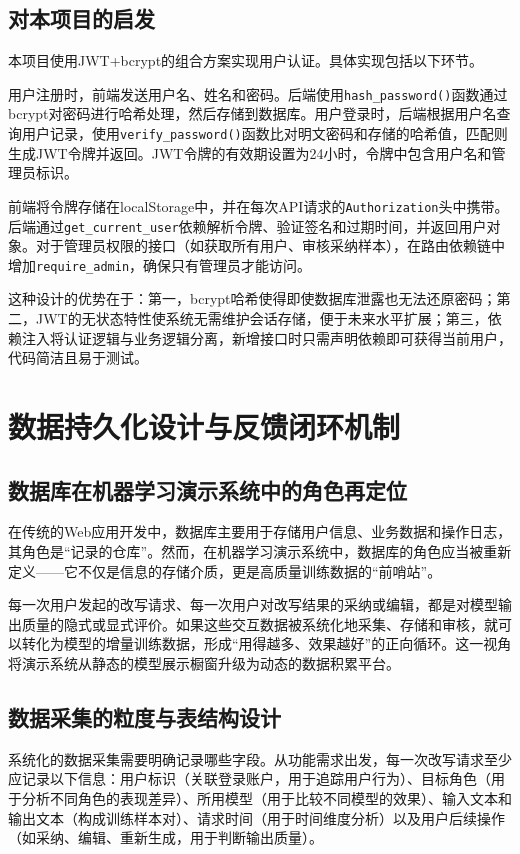 \documentclass[12pt,a4paper]{ctexart}
\begin{document}
\subsection{对本项目的启发}

本项目使用JWT+bcrypt的组合方案实现用户认证。具体实现包括以下环节。

用户注册时，前端发送用户名、姓名和密码。后端使用\texttt{hash\_password()}函数通过bcrypt对密码进行哈希处理，然后存储到数据库。用户登录时，后端根据用户名查询用户记录，使用\texttt{verify\_password()}函数比对明文密码和存储的哈希值，匹配则生成JWT令牌并返回。JWT令牌的有效期设置为24小时，令牌中包含用户名和管理员标识。

前端将令牌存储在localStorage中，并在每次API请求的\texttt{Authorization}头中携带。后端通过\texttt{get\_current\_user}依赖解析令牌、验证签名和过期时间，并返回用户对象。对于管理员权限的接口（如获取所有用户、审核采纳样本），在路由依赖链中增加\texttt{require\_admin}，确保只有管理员才能访问。

这种设计的优势在于：第一，bcrypt哈希使得即使数据库泄露也无法还原密码；第二，JWT的无状态特性使系统无需维护会话存储，便于未来水平扩展；第三，依赖注入将认证逻辑与业务逻辑分离，新增接口时只需声明依赖即可获得当前用户，代码简洁且易于测试。

\section{数据持久化设计与反馈闭环机制}

\subsection{数据库在机器学习演示系统中的角色再定位}

在传统的Web应用开发中，数据库主要用于存储用户信息、业务数据和操作日志，其角色是“记录的仓库”。然而，在机器学习演示系统中，数据库的角色应当被重新定义——它不仅是信息的存储介质，更是高质量训练数据的“前哨站”。

每一次用户发起的改写请求、每一次用户对改写结果的采纳或编辑，都是对模型输出质量的隐式或显式评价。如果这些交互数据被系统化地采集、存储和审核，就可以转化为模型的增量训练数据，形成“用得越多、效果越好”的正向循环。这一视角将演示系统从静态的模型展示橱窗升级为动态的数据积累平台。

\subsection{数据采集的粒度与表结构设计}

系统化的数据采集需要明确记录哪些字段。从功能需求出发，每一次改写请求至少应记录以下信息：用户标识（关联登录账户，用于追踪用户行为）、目标角色（用于分析不同角色的表现差异）、所用模型（用于比较不同模型的效果）、输入文本和输出文本（构成训练样本对）、请求时间（用于时间维度分析）以及用户后续操作（如采纳、编辑、重新生成，用于判断输出质量）。
\end{document}
